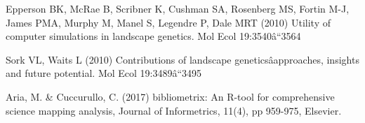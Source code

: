 \documentclass[]{article}
\begin{document}
Epperson BK, McRae B, Scribner K, Cushman SA, Rosenberg MS, Fortin M-J,
James PMA, Murphy M, Manel S, Legendre P, Dale MRT (2010) Utility of
computer simulations in landscape genetics. Mol Ecol 19:3540â``3564

Sork VL, Waits L (2010) Contributions of landscape
geneticsâapproaches, insights and future potential. Mol Ecol
19:3489â``3495

Aria, M. \& Cuccurullo, C. (2017) bibliometrix: An R-tool for
comprehensive science mapping analysis, Journal of Informetrics, 11(4),
pp 959-975, Elsevier.
\end{document}
